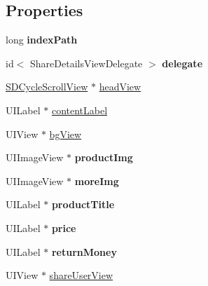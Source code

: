 \subsection*{Properties}
\begin{DoxyCompactItemize}
\item 
\mbox{\label{interface_share_details_cell_af3eadba1270d407dd73c412c4f3eab4d}} 
long {\bfseries index\+Path}
\item 
\mbox{\label{interface_share_details_cell_a9a5f1d536cca3a0216b4e380497a5f1f}} 
id$<$ Share\+Details\+View\+Delegate $>$ {\bfseries delegate}
\item 
\mbox{\hyperlink{interface_s_d_cycle_scroll_view}{S\+D\+Cycle\+Scroll\+View}} $\ast$ \mbox{\hyperlink{interface_share_details_cell_a92a359e4e06be1d02b39c6f2568cba5b}{head\+View}}
\item 
U\+I\+Label $\ast$ \mbox{\hyperlink{interface_share_details_cell_ad016f83b0f3e6eec91093a4d795972bd}{content\+Label}}
\item 
U\+I\+View $\ast$ \mbox{\hyperlink{interface_share_details_cell_a9c7c5c4c044c86e5a21a3d846b096cd4}{bg\+View}}
\item 
\mbox{\label{interface_share_details_cell_acdb41dbf0ae1b790a95cfdf7653da4e8}} 
U\+I\+Image\+View $\ast$ {\bfseries product\+Img}
\item 
\mbox{\label{interface_share_details_cell_a35958b48e153691ca58b5c3759e8c74f}} 
U\+I\+Image\+View $\ast$ {\bfseries more\+Img}
\item 
\mbox{\label{interface_share_details_cell_ad1338578b3920227be521b186fbbc67c}} 
U\+I\+Label $\ast$ {\bfseries product\+Title}
\item 
\mbox{\label{interface_share_details_cell_a04ccf3928a61e5caa446a30f7ef47492}} 
U\+I\+Label $\ast$ {\bfseries price}
\item 
\mbox{\label{interface_share_details_cell_a73cce7672a2504f25d07b88468c3ba1a}} 
U\+I\+Label $\ast$ {\bfseries return\+Money}
\item 
U\+I\+View $\ast$ \mbox{\hyperlink{interface_share_details_cell_a9551ed21bb1e661c2170a23ea53cbb3b}{share\+User\+View}}

\end{DoxyCompactItemize}
